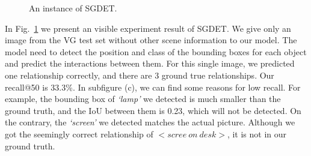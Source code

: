 \begin{figure}[!h]
 	\caption[An instance of SGDET.]{An instance of SGDET.}
 	\label{fig:sgdet}
 \end{figure}
In Fig.~\ref{fig:sgdet}  we present an visible experiment result of SGDET. We give only an image from the VG test set without other scene information to our model. The model need to detect the position and class of the bounding boxes for each object and predict the interactions between them. For this single image, we predicted one relationship correctly, and there are 3 ground true relationships. Our recall@50 is 33.3\%.  In subfigure (c), we can find some reasons for low recall. For example, the bounding box of \textit{`lamp' }we detected is much smaller than the ground truth, and the IoU between them is 0.23, which will not be detected. On the contrary, the \textit{`screen' }we detected matches the actual picture. Although we got the seemingly correct relationship of $ <scree\ on \ desk> $, it is not in our ground truth.







